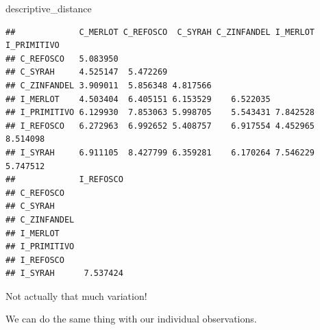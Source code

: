 \documentclass[
]{book}
\newenvironment{Shaded}{\begin{snugshade}}{\end{snugshade}}
\newcommand{\NormalTok}[1]{#1}
\begin{document}
\begin{Shaded}
\begin{Highlighting}[]
\NormalTok{descriptive\_distance}
\end{Highlighting}
\end{Shaded}

\begin{verbatim}
##             C_MERLOT C_REFOSCO  C_SYRAH C_ZINFANDEL I_MERLOT I_PRIMITIVO
## C_REFOSCO   5.083950                                                    
## C_SYRAH     4.525147  5.472269                                          
## C_ZINFANDEL 3.909011  5.856348 4.817566                                 
## I_MERLOT    4.503404  6.405151 6.153529    6.522035                     
## I_PRIMITIVO 6.129930  7.853063 5.998705    5.543431 7.842528            
## I_REFOSCO   6.272963  6.992652 5.408757    6.917554 4.452965    8.514098
## I_SYRAH     6.911105  8.427799 6.359281    6.170264 7.546229    5.747512
##             I_REFOSCO
## C_REFOSCO            
## C_SYRAH              
## C_ZINFANDEL          
## I_MERLOT             
## I_PRIMITIVO          
## I_REFOSCO            
## I_SYRAH      7.537424
\end{verbatim}

Not actually that much variation!

We can do the same thing with our individual observations.
\end{document}
